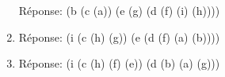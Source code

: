 \documentclass[a4paper, 11pt]{article}
\begin{document}
\begin{enumerate}
Réponse: (b (c (a)) (e (g) (d (f) (i) (h))))
  \item {}
Réponse: (i (c (h) (g)) (e (d (f) (a) (b))))
  \item {}
Réponse: (i (c (h) (f) (e)) (d (b) (a) (g)))
\end{enumerate}
\end{document}

